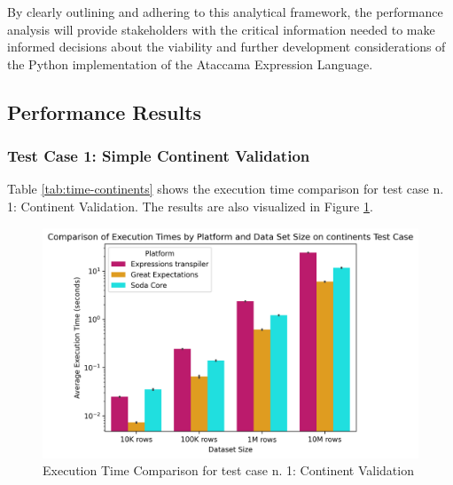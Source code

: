 By clearly outlining and adhering to this analytical framework, the performance analysis will provide stakeholders with the critical information needed to make informed decisions about the viability and further development considerations of the Python implementation of the Ataccama Expression Language.

\subsection{Performance Results}

\subsubsection{Test Case 1: Simple Continent Validation}

Table \ref{tab:time-continents} shows the execution time comparison for test case n. 1: Continent Validation. The results are also visualized in Figure \ref{fig:time-comparison-continents}.

\begin{table}[h] 
    \footnotesize
    \centering 
    \caption{Execution Time Comparison for test case n. 1: Continent Validation} 
    \label{tab:time-continents} 
    
\end{table}

\begin{figure}[htbp]
  \centering
  \includegraphics[width=1.0\columnwidth]{result-analysis/plots/execution_time_comparison_continents.png}
  \caption{Execution Time Comparison for test case n. 1: Continent Validation}
  \label{fig:time-comparison-continents}
\end{figure}


